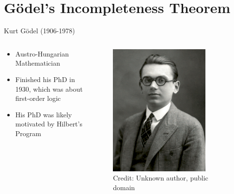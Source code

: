 \documentclass[utf8]{beamer}
\begin{document}
\part{G{\"o}del's Incompleteness Theorem}
\begin{frame}
\partpage
\end{frame}

\begin{frame}{Kurt G{\"o}del (1906-1978)}
\begin{columns}
\begin{column}{0.6\textwidth}
\begin{itemize}
\item Austro-Hungarian Mathematician
\item Finished his PhD in 1930, which was about first-order logic
\item His PhD was likely motivated by Hilbert's Program
\end{itemize}
\end{column}
\begin{column}{0.4\textwidth}
\begin{figure}
\centering
\includegraphics[width=0.8\textwidth]{images/goedel.jpg}
\\
\tiny Credit: Unknown author, public domain
\end{figure}
\end{column}
\end{columns}
\end{frame}
\end{document}
